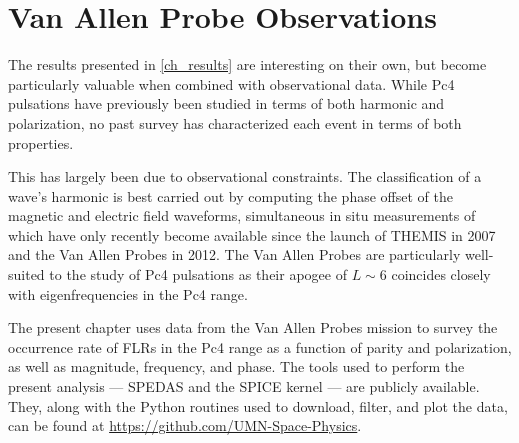 


\chapter{Van Allen Probe Observations}
  \label{ch_rbsp}

The results presented in \cref{ch_results} are interesting on their own, but
become particularly valuable when combined with observational data.
While Pc4 pulsations have previously been studied in terms of both
harmonic\cite{arthur_1981,cummings_1969,engebretson_1988,hughes_1978,
singer_1982,takahashi_1984} and 
polarization\cite{anderson_1990,dai_2015,dai_2013,kokubun_1989,liu_2009}, no
past survey has characterized each event in terms of both properties. 

This has largely been due to observational constraints. The classification of a
wave's harmonic is best carried out by computing the phase offset of the
magnetic and electric field waveforms, simultaneous in situ measurements of
which have only recently become available since the launch of
THEMIS\cite{angelopoulos_2008} in 2007 and the Van Allen
Probes\cite{stratton_2012} in 2012. The Van Allen Probes are particularly
well-suited to the study of Pc4 pulsations as their apogee of $L \sim 6$
coincides closely with eigenfrequencies in the Pc4 range. 

The present chapter uses data from the Van Allen Probes mission to survey the
occurrence rate of FLRs in the Pc4 range as a function of parity and
polarization, as well as magnitude, frequency, and phase. The tools used to
perform the present analysis --- SPEDAS and the SPICE kernel --- are publicly
available. They, along with the Python routines used to download, filter, and
plot the data, can be found at \url{https://github.com/UMN-Space-Physics}. 



